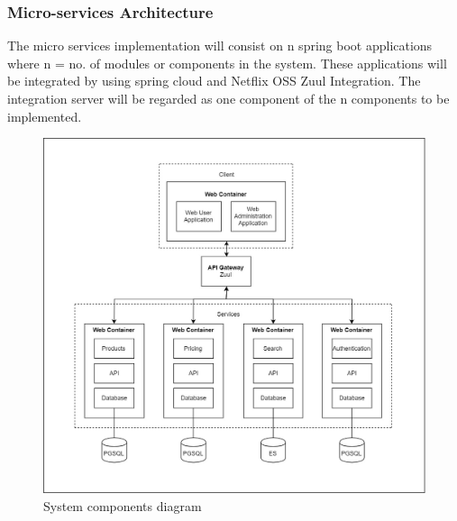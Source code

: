 \documentclass[a4paper,10pt]{article}
\begin{document}
\subsubsection{Micro-services Architecture}
The micro services implementation will consist on n spring boot applications where n = no. of modules or components in the system. These applications will be integrated by using spring cloud and Netflix OSS Zuul Integration. The integration server will be regarded as one component of the n components to be implemented.
\begin{figure}[H]
	\includegraphics[scale=0.5]{component_diagram}
	\caption{System components diagram}
\end{figure}
\end{document}

